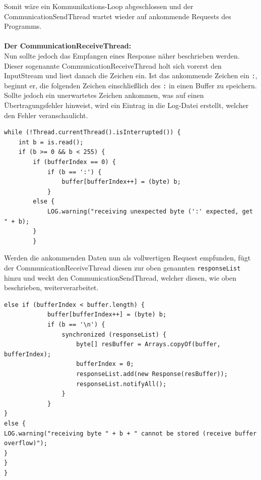 Somit wäre ein Kommunikations-Loop abgeschlossen und der CommunicationSendThread wartet wieder auf ankommende Requests des Programms.\\\\
\textbf{Der CommunicationReceiveThread:}\\
Nun sollte jedoch das Empfangen eines Response näher beschrieben werden.
Dieser sogenannte CommunicationReceiveThread holt sich vorerst den InputStream und liest danach die Zeichen ein.
Ist das ankommende Zeichen ein \lstinline[style=java]{:}, beginnt er, die folgenden Zeichen einschließlich des \lstinline[style=java]{:} in einen Buffer zu speichern.
Sollte jedoch ein unerwartetes Zeichen ankommen, was auf einen Übertragungsfehler hinweist, wird ein Eintrag in die Log-Datei erstellt, welcher den Fehler veranschaulicht.
\begin{lstlisting}[style=java,caption=Teilabschnitt CommunicationReceiveThread,label=commThreadSend]
while (!Thread.currentThread().isInterrupted()) {
    int b = is.read();
    if (b >= 0 && b < 255) {
        if (bufferIndex == 0) {
            if (b == ':') {
                buffer[bufferIndex++] = (byte) b;
            }
        else {
            LOG.warning("receiving unexpected byte (':' expected, get " + b);
        }
        }
\end{lstlisting}
Werden die ankommenden Daten nun als vollwertigen Request empfunden, fügt der CommunicationReceiveThread diesen zur oben genannten \lstinline[style=java]{responseList} hinzu und weckt den CommunicationSendThread, welcher diesen, wie oben beschrieben, weiterverarbeitet.
\begin{lstlisting}[style=java,caption=Teilabschnitt CommunicationReceiveThread,label=commThreadSend]
        else if (bufferIndex < buffer.length) {
            buffer[bufferIndex++] = (byte) b;
            if (b == '\n') {
                synchronized (responseList) {
                    byte[] resBuffer = Arrays.copyOf(buffer, bufferIndex);
                    bufferIndex = 0;
                    responseList.add(new Response(resBuffer));
                    responseList.notifyAll();
                }
            }
}
else {
LOG.warning("receiving byte " + b + " cannot be stored (receive buffer overflow)");
}
}
}
\end{lstlisting}
